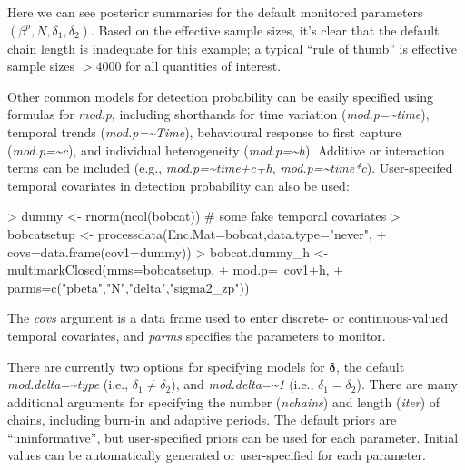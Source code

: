 \documentclass[12pt]{article}
\begin{document}
Here we can see posterior summaries for the default monitored parameters $(\beta^p, N, \delta_1, \delta_2)$. Based on the effective sample sizes, it's clear that the default chain length is inadequate for this example; a typical ``rule of thumb'' is effective sample sizes $>4000$ for all quantities of interest.

Other common models for detection probability can be easily specified using formulas for \textit{mod.p}, including shorthands for time variation (\textit{mod.p={\textasciitilde{}}time}), temporal trends (\textit{mod.p={\textasciitilde{}}Time}), behavioural response to first capture (\textit{mod.p={\textasciitilde{}}c}), and individual heterogeneity (\textit{mod.p={\textasciitilde{}}h}). Additive or interaction terms can be included (e.g., \textit{mod.p={\textasciitilde{}}time+c+h}, \textit{mod.p={\textasciitilde{}}time*c}). User-specifed temporal covariates in detection probability can also be used: 
\begin{Schunk}
\begin{Sinput}
> dummy <- rnorm(ncol(bobcat)) # some fake temporal covariates
> bobcatsetup <- processdata(Enc.Mat=bobcat,data.type="never",
+                     covs=data.frame(cov1=dummy))
> bobcat.dummy_h <- multimarkClosed(mms=bobcatsetup,
+                     mod.p=~cov1+h,
+                     parms=c("pbeta","N","delta","sigma2_zp"))
\end{Sinput}
\end{Schunk}
The \textit{covs} argument is a data frame used to enter discrete- or continuous-valued temporal covariates, and \textit{parms} specifies the parameters to monitor. 

There are currently two options for specifying models for ${\boldsymbol \delta}$, the default \textit{mod.delta={\textasciitilde{}}type} (i.e., $\delta_1 \ne \delta_2$), and \textit{mod.delta={\textasciitilde{}}1} (i.e., $\delta_1 = \delta_2$). There are many additional arguments for specifying the number (\textit{nchains}) and length (\textit{iter}) of chains, including burn-in and adaptive periods. The default priors are ``uninformative'', but user-specified priors can be used for each parameter. Initial values can be automatically generated or user-specified for each parameter.
\end{document}
